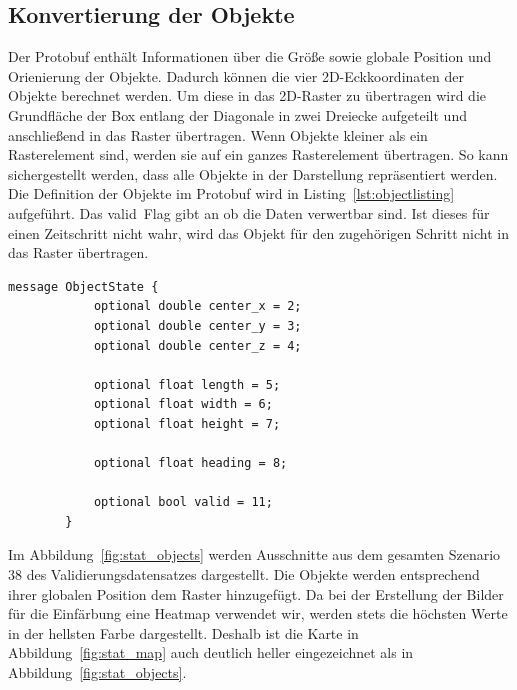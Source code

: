 \documentclass[12pt]{article}
\begin{document}
    \subsection{Konvertierung der Objekte}
        Der Protobuf enthält Informationen über die Größe sowie globale Position und Orienierung der Objekte. 
        Dadurch können die vier 2D-Eckkoordinaten der Objekte berechnet werden. Um diese in das 2D-Raster zu übertragen wird die Grundfläche der Box entlang der Diagonale in  
        zwei Dreiecke aufgeteilt und anschließend in das Raster übertragen. Wenn Objekte kleiner als ein Rasterelement sind, werden sie auf ein ganzes Rasterelement übertragen. 
        So kann sichergestellt werden, dass alle Objekte in der Darstellung repräsentiert werden.
        Die Definition der Objekte im Protobuf wird in Listing~\ref{lst:objectlisting} aufgeführt. 
        Das \grqq valid\grqq~Flag gibt an ob die Daten verwertbar sind. 
        Ist dieses für einen Zeitschritt nicht wahr, wird das Objekt für den zugehörigen Schritt nicht in das Raster übertragen.
        \vspace{0.5cm}
        \begin{lstlisting}[language=protobuf2, caption=Auszug aus scenario.proto, label={lst:objectlisting}]
        message ObjectState {
            optional double center_x = 2;
            optional double center_y = 3;
            optional double center_z = 4;
            
            optional float length = 5;
            optional float width = 6;
            optional float height = 7;

            optional float heading = 8;

            optional bool valid = 11;
        }
        \end{lstlisting}
        Im Abbildung~\ref{fig:stat_objects} werden Ausschnitte aus dem gesamten Szenario 38 des Validierungsdatensatzes dargestellt.
        Die Objekte werden entsprechend ihrer globalen Position dem Raster hinzugefügt.
        Da bei der Erstellung der Bilder für die Einfärbung eine Heatmap verwendet wir, werden stets die höchsten Werte in der hellsten Farbe dargestellt. 
        Deshalb ist die Karte in Abbildung~\ref{fig:stat_map} auch deutlich heller eingezeichnet als in Abbildung~\ref{fig:stat_objects}.
\end{document}
